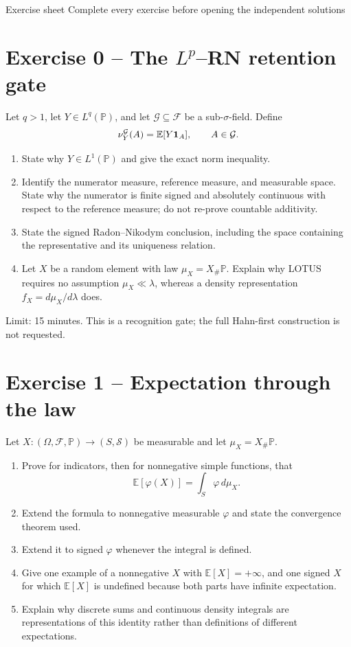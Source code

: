 \sheettitle
  {Exercise sheet}
  {Complete every exercise before opening the independent solutions}

\section*{Exercise 0 -- The $L^p$--RN retention gate}

Let $q>1$, let $Y\in L^q(\mathbb P)$, and let $\mathcal G\subseteq\mathcal F$ be a sub-$\sigma$-field. Define
\[
\nu_Y^{\mathcal G}(A)=\mathbb E[Y\mathbf 1_A],
\qquad A\in\mathcal G.
\]
\begin{enumerate}
  \item State why $Y\in L^1(\mathbb P)$ and give the exact norm inequality.
  \item Identify the numerator measure, reference measure, and measurable space. State why the numerator is finite signed and absolutely continuous with respect to the reference measure; do not re-prove countable additivity.
  \item State the signed Radon--Nikodym conclusion, including the space containing the representative and its uniqueness relation.
  \item Let $X$ be a random element with law $\mu_X=X_\#\mathbb P$. Explain why LOTUS requires no assumption $\mu_X\ll\lambda$, whereas a density representation $f_X=d\mu_X/d\lambda$ does.
\end{enumerate}
Limit: 15 minutes. This is a recognition gate; the full Hahn-first construction is not requested.

\section*{Exercise 1 -- Expectation through the law}

Let $X:(\Omega,\mathcal F,\mathbb P)\to(S,\mathcal S)$ be measurable and let $\mu_X=X_\#\mathbb P$.
\begin{enumerate}
  \item Prove for indicators, then for nonnegative simple functions, that
  \[
  \mathbb E[\varphi(X)]
  =
  \int_S\varphi\,d\mu_X.
  \]
  \item Extend the formula to nonnegative measurable $\varphi$ and state the convergence theorem used.
  \item Extend it to signed $\varphi$ whenever the integral is defined.
  \item Give one example of a nonnegative $X$ with $\mathbb E[X]=+\infty$, and one signed $X$ for which $\mathbb E[X]$ is undefined because both parts have infinite expectation.
  \item Explain why discrete sums and continuous density integrals are representations of this identity rather than definitions of different expectations.
\end{enumerate}

